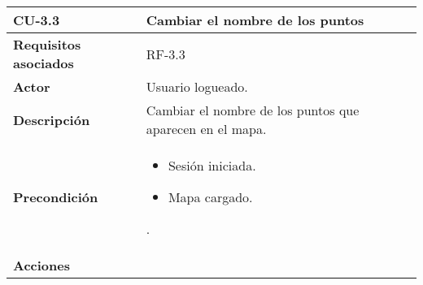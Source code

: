 \begin{longtable}[H]{@{}l|l@{}}
	\toprule
	\begin{minipage}[b]{0.23\columnwidth}\raggedright\strut
		\textbf{CU-3.3}\strut
	\end{minipage} & \begin{minipage}[b]{0.71\columnwidth}\raggedright\strut
		\textbf{Cambiar el nombre de los puntos}\strut
	\end{minipage}\tabularnewline
	\toprule
	\endhead
	\begin{minipage}[t]{0.23\columnwidth}\raggedright\strut
		\textbf{Requisitos asociados}\strut
	\end{minipage} & \begin{minipage}[t]{0.71\columnwidth}\raggedright\strut
		RF-3.3\strut
	\end{minipage}\tabularnewline
	\midrule
	\begin{minipage}[t]{0.23\columnwidth}\raggedright\strut
		\textbf{Actor}\strut
	\end{minipage} & \begin{minipage}[t]{0.71\columnwidth}\raggedright\strut
		Usuario logueado.\strut
	\end{minipage}\tabularnewline
	\midrule
	\begin{minipage}[t]{0.23\columnwidth}\raggedright\strut
		\textbf{Descripción}\strut
	\end{minipage} & \begin{minipage}[t]{0.71\columnwidth}\raggedright\strut
		Cambiar el nombre de los puntos que aparecen en el mapa.\strut
	\end{minipage}\tabularnewline
	\midrule
	\begin{minipage}[t]{0.23\columnwidth}\raggedright\strut
		\textbf{Precondición}\strut
	\end{minipage} & \begin{minipage}[t]{0.71\columnwidth}\raggedright
		\begin{itemize}
			\item Sesión iniciada.
			\item Mapa cargado.
		\end{itemize}.
	\end{minipage}\tabularnewline
	\midrule
	\begin{minipage}[t]{0.23\columnwidth}\raggedright\strut
		\textbf{Acciones}\strut
	\end{minipage} & \begin{minipage}[t]{0.71\columnwidth}\raggedright
		\begin{enumerate}

\end{enumerate}
\end{minipage}
\end{longtable}
